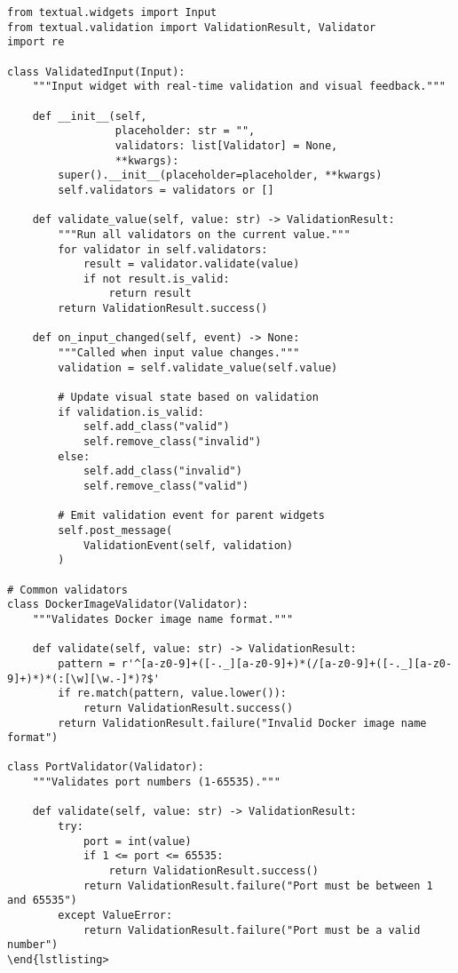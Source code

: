 \documentclass[11pt,a4paper]{article}
\begin{document}
\begin{lstlisting}[caption={ValidatedInput Implementation}]
from textual.widgets import Input
from textual.validation import ValidationResult, Validator
import re

class ValidatedInput(Input):
    """Input widget with real-time validation and visual feedback."""
    
    def __init__(self, 
                 placeholder: str = "",
                 validators: list[Validator] = None,
                 **kwargs):
        super().__init__(placeholder=placeholder, **kwargs)
        self.validators = validators or []
        
    def validate_value(self, value: str) -> ValidationResult:
        """Run all validators on the current value."""
        for validator in self.validators:
            result = validator.validate(value)
            if not result.is_valid:
                return result
        return ValidationResult.success()
        
    def on_input_changed(self, event) -> None:
        """Called when input value changes."""
        validation = self.validate_value(self.value)
        
        # Update visual state based on validation
        if validation.is_valid:
            self.add_class("valid")
            self.remove_class("invalid")
        else:
            self.add_class("invalid")
            self.remove_class("valid")
            
        # Emit validation event for parent widgets
        self.post_message(
            ValidationEvent(self, validation)
        )

# Common validators
class DockerImageValidator(Validator):
    """Validates Docker image name format."""
    
    def validate(self, value: str) -> ValidationResult:
        pattern = r'^[a-z0-9]+([-._][a-z0-9]+)*(/[a-z0-9]+([-._][a-z0-9]+)*)*(:[\w][\w.-]*)?$'
        if re.match(pattern, value.lower()):
            return ValidationResult.success()
        return ValidationResult.failure("Invalid Docker image name format")

class PortValidator(Validator):
    """Validates port numbers (1-65535)."""
    
    def validate(self, value: str) -> ValidationResult:
        try:
            port = int(value)
            if 1 <= port <= 65535:
                return ValidationResult.success()
            return ValidationResult.failure("Port must be between 1 and 65535")
        except ValueError:
            return ValidationResult.failure("Port must be a valid number")
\end{lstlisting>


\end{lstlisting}
\end{document}
